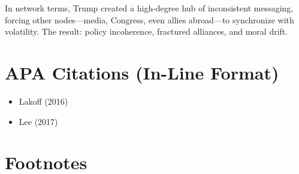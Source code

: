 \documentclass[
]{article}
\providecommand{\tightlist}{%
  \setlength{\itemsep}{0pt}\setlength{\parskip}{0pt}}
\begin{document}
In network terms, Trump created a high-degree hub of inconsistent messaging, forcing other nodes---media, Congress, even allies abroad---to synchronize with volatility. The result: policy incoherence, fractured alliances, and moral drift.

\section*{APA Citations (In-Line Format)}

\begin{itemize}
\tightlist
\item
  Lakoff (2016)
\item
  Lee (2017)
\end{itemize}

\section*{Footnotes}
\end{document}
